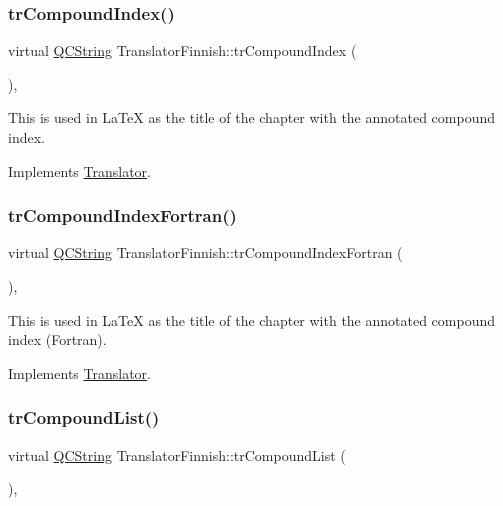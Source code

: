 \subsubsection{\texorpdfstring{trCompoundIndex()}{trCompoundIndex()}}
{\footnotesize\ttfamily virtual \mbox{\hyperlink{class_q_c_string}{Q\+C\+String}} Translator\+Finnish\+::tr\+Compound\+Index (\begin{DoxyParamCaption}{ }\end{DoxyParamCaption})\hspace{0.3cm}{\ttfamily [inline]}, {\ttfamily [virtual]}}

This is used in La\+TeX as the title of the chapter with the annotated compound index. 

Implements \mbox{\hyperlink{class_translator}{Translator}}.

\mbox{\label{class_translator_finnish_acc13d611315189cdc8aca52d025bb15d}} 
\subsubsection{\texorpdfstring{trCompoundIndexFortran()}{trCompoundIndexFortran()}}
{\footnotesize\ttfamily virtual \mbox{\hyperlink{class_q_c_string}{Q\+C\+String}} Translator\+Finnish\+::tr\+Compound\+Index\+Fortran (\begin{DoxyParamCaption}{ }\end{DoxyParamCaption})\hspace{0.3cm}{\ttfamily [inline]}, {\ttfamily [virtual]}}

This is used in La\+TeX as the title of the chapter with the annotated compound index (Fortran). 

Implements \mbox{\hyperlink{class_translator}{Translator}}.

\mbox{\label{class_translator_finnish_ab74ce22a87ada621857ee1470b976389}} 
\subsubsection{\texorpdfstring{trCompoundList()}{trCompoundList()}}
{\footnotesize\ttfamily virtual \mbox{\hyperlink{class_q_c_string}{Q\+C\+String}} Translator\+Finnish\+::tr\+Compound\+List (\begin{DoxyParamCaption}{ }\end{DoxyParamCaption})\hspace{0.3cm}{\ttfamily [inline]}, {\ttfamily [virtual]}}

